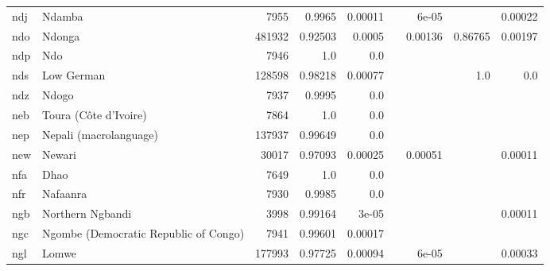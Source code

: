 \documentclass[11pt]{article}
\begin{document}
\begin{table*}[h]
{\begin{tabular}{llrrrrrrr}
ndj         & Ndamba         & 7955         & 0.9965         & 0.00011         &          & 6e-05         &          & 0.00022         \\

ndo         & Ndonga         & 481932         & 0.92503         & 0.0005         &          & 0.00136         & 0.86765         & 0.00197         \\

ndp         & Ndo         & 7946         & 1.0         & 0.0         &          &          &          &          \\

nds         & Low German         & 128598         & 0.98218         & 0.00077         &          &          & 1.0         & 0.0         \\

ndz         & Ndogo         & 7937         & 0.9995         & 0.0         &          &          &          &          \\

neb         & Toura (Côte d'Ivoire)         & 7864         & 1.0         & 0.0         &          &          &          &          \\

nep         & Nepali (macrolanguage)         & 137937         & 0.99649         & 0.0         &          &          &          &          \\

new         & Newari         & 30017         & 0.97093         & 0.00025         &          & 0.00051         &          & 0.00011         \\

nfa         & Dhao         & 7649         & 1.0         & 0.0         &          &          &          &          \\

nfr         & Nafaanra         & 7930         & 0.9985         & 0.0         &          &          &          &          \\

ngb         & Northern Ngbandi         & 3998         & 0.99164         & 3e-05         &          &          &          & 0.00011         \\

ngc         & Ngombe (Democratic Republic of Congo)         & 7941         & 0.99601         & 0.00017         &          &          &          &          \\

ngl         & Lomwe         & 177993         & 0.97725         & 0.00094         &          & 6e-05         &          & 0.00033         \\


\end{tabular}}
\end{table*}
\end{document}
